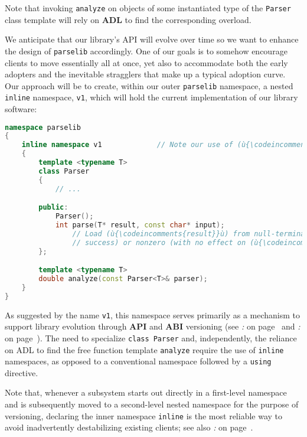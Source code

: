 \noindent Note that invoking \texttt{analyze} on objects of some instantiated type
of the \texttt{Parser} class template will rely on \textbf{ADL} to find
the corresponding overload.

We anticipate that our library's API will evolve over time so we want to
enhance the design of \texttt{parselib} accordingly. One of our goals is
to somehow encourage clients to move essentially all at once, yet also to
accommodate both the early adopters and the inevitable stragglers that
make up a typical adoption curve. Our approach will be to create, within
our outer \texttt{parselib} namespace, a nested \texttt{inline}
namespace, \texttt{v1}, which will hold the current implementation of
our library software:

\begin{lstlisting}[language=C++]
namespace parselib
{
    inline namespace v1             // Note our use of (ù{\codeincomments{inline}}ù) namespace here.
    {
        template <typename T>
        class Parser
        {
            // ...

        public:
            Parser();
            int parse(T* result, const char* input);
                // Load (ù{\codeincomments{result}}ù) from null-terminated (ù{\codeincomments{input}}ù); return 0 (on
                // success) or nonzero (with no effect on (ù{\codeincomments{result}}ù)).
        };

        template <typename T>
        double analyze(const Parser<T>& parser);
    }
}
\end{lstlisting}

\noindent As suggested by the name \texttt{v1}, this namespace serves primarily as
a mechanism to support library evolution through \textbf{API} and
\textbf{ABI} versioning (see \textit{: } on page~\pageref{link-safe-abi-versioning} and \textit{: } on page~\pageref{build-modes-and-abi-link-safety}). The need to specialize \texttt{class}~\texttt{Parser} and,
independently, the reliance on ADL to find the free function template
\texttt{analyze} require the use of \texttt{inline} namespaces, as
opposed to a conventional namespace followed by a \texttt{using}
directive.

Note that, whenever a subsystem starts out directly in a first-level
namespace and is subsequently moved to a second-level nested namespace
for the purpose of versioning, declaring the inner namespace
\texttt{inline} is the most reliable way to avoid inadvertently
destabilizing existing clients; see also \textit{: } on page~\pageref{enabling-selective-using-directives-for-short-named-entities}.

